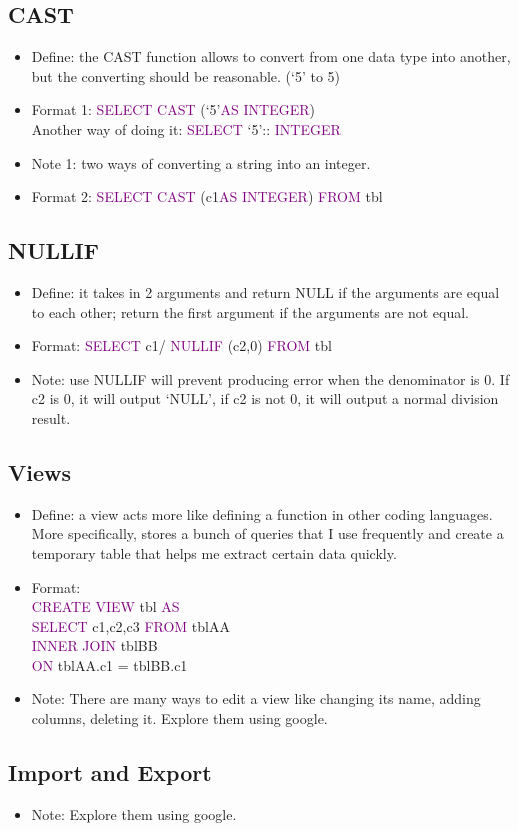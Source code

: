 \documentclass[a4paper]{article}
\begin{document}
\subsection{CAST}
\begin{itemize}
  \item Define: the CAST function allows to convert from one data type into another, but the converting should be reasonable. (`5' to 5)
  \item Format 1: \textcolor{purple}{SELECT} \textcolor{purple}{CAST} (`5'\textcolor{purple}{AS} \textcolor{purple}{INTEGER}) \\ Another way of doing it: \textcolor{purple}{SELECT} `5':: \textcolor{purple}{INTEGER}
  \item Note 1: two ways of converting a string into an integer.
  \item Format 2: \textcolor{purple}{SELECT} \textcolor{purple}{CAST} (c1\textcolor{purple}{AS} \textcolor{purple}{INTEGER}) \textcolor{purple}{FROM} tbl
  
\end{itemize}

\subsection{NULLIF}
\begin{itemize}
  \item Define: it takes in 2 arguments and return NULL if the arguments are equal to each other; return the first argument if the arguments are not equal. 
  \item Format: \textcolor{purple}{SELECT} c1/ \textcolor{purple}{NULLIF} (c2,0) \textcolor{purple}{FROM} tbl  
  \item Note: use NULLIF will prevent producing error when the denominator is 0. If c2 is 0, it will output `NULL', if c2 is not 0, it will output a normal division result.
\end{itemize}

\subsection{Views}
\begin{itemize}
  \item Define: a view acts more like defining a function in other coding languages. More specifically, stores a bunch of queries that I use frequently and create a temporary table that helps me extract certain data quickly. 
  \item Format:\\ \textcolor{purple}{CREATE VIEW} tbl \textcolor{purple}{AS}\\ \textcolor{purple}{SELECT} c1,c2,c3 \textcolor{purple}{FROM} tblAA\\
  \textcolor{purple}{INNER JOIN} tblBB\\
  \textcolor{purple}{ON} tblAA.c1 = tblBB.c1 
  \item Note: There are many ways to edit a view like changing its name, adding columns, deleting it. Explore them using google.  
\end{itemize}

\subsection{Import and Export}
\begin{itemize}
  \item Note: Explore them using google.  
\end{itemize}
\end{document}
